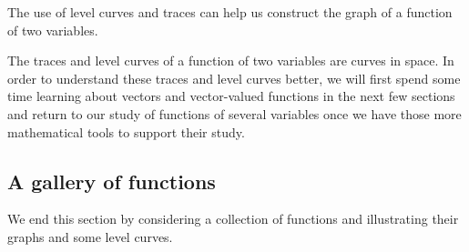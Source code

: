 The use of level curves and traces can help us construct the graph of
a function of two variables.



%

The traces and level curves of a function of two variables are curves
in space. In order to understand these traces and level curves better,
we will first spend some time learning about vectors and vector-valued
functions in the next few sections and return to our study of
functions of several variables once we have those more mathematical
tools to support their study.

\subsection*{A gallery of functions}

We end this section by considering a collection of functions and
illustrating their graphs and some level curves.


